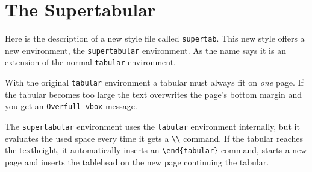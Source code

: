 \topmargin 0cm
\oddsidemargin 0cm
\textheight 23cm
\textwidth 15cm
\newcommand{\tbsp}{\rule{0pt}{18pt}}

\section{The Supertabular}
Here is the description of a new style file called \verb|supertab|.
This new style offers a new environment, the \verb|supertabular|
environment. As the name says it is an extension of the normal
\verb|tabular| environment.
 
With the original \verb|tabular| environment a tabular must always fit
on {\it one} page. If the tabular becomes too large the text overwrites
the page's bottom margin and you get an \verb|Overfull vbox| message.
 
The \verb|supertabular| environment uses the \verb|tabular| environment
internally, but it evaluates the used space every time it gets a
\verb|\\| command. If the tabular reaches the textheight,
it automatically inserts an \verb|\end{tabular}| command, starts a new
page and inserts the tablehead on the new page continuing the tabular.
 
